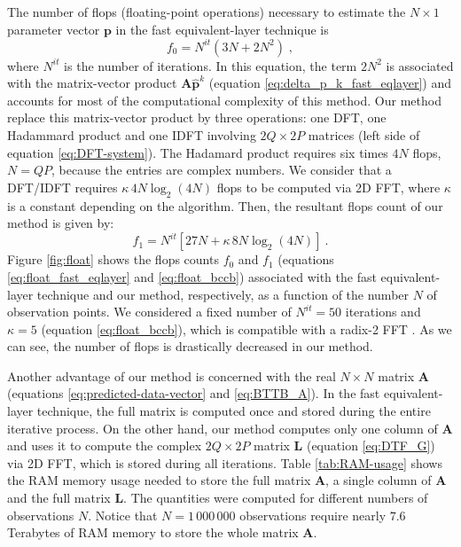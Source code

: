 The number of flops (floating-point operations) necessary to estimate the 
$N \times 1$ parameter vector $\mathbf{p}$ in the fast equivalent-layer technique 
\citep{siqueira-etal2017} is
\begin{equation}
f_{0} = N^{it} (3N + 2N^{2}) \; ,
\label{eq:float_fast_eqlayer}
\end{equation}
where $N^{it}$ is the number of iterations. In this equation, the term $2N^2$ is associated 
with the matrix-vector product $\mathbf{A} \hat{\mathbf{p}}^{k}$ (equation 
\ref{eq:delta_p_k_fast_eqlayer}) and accounts for most of the computational complexity 
of this method.
Our method replace this matrix-vector product by three operations: 
one DFT, one Hadammard product and one IDFT involving $2Q \times 2P$ matrices 
(left side of equation \ref{eq:DFT-system}). 
The Hadamard product requires six times $4N$ flops, $N = QP$, because the entries are 
complex numbers.
We consider that a DFT/IDFT requires $\kappa \, 4N \log_{2}(4N)$ flops to be computed via 2D FFT, 
where $\kappa$ is a constant depending on the algorithm. 
Then, the resultant flops count of our method is given by:
\begin{equation}
f_{1} = N^{it} \left[ 27N + \kappa \, 8N \log_{2}(4N) \right] \: .
\label{eq:float_bccb}
\end{equation}
Figure \ref{fig:float} shows the flops counts $f_{0}$ and $f_{1}$ (equations \ref{eq:float_fast_eqlayer}
and \ref{eq:float_bccb}) associated with the fast equivalent-layer technique \citep{siqueira-etal2017} and 
our method, respectively, as a function of the number $N$ of observation points. 
We considered a fixed number of $N^{it} = 50$ iterations and $\kappa = 5$ (equation \ref{eq:float_bccb}),
which is compatible with a radix-2 FFT \citep[][ p. 16]{vanloan1992}.
As we can see, the number of flops is drastically decreased in our method.

Another advantage of our method is concerned with the real $N \times N$ matrix $\mathbf{A}$ 
(equations \ref{eq:predicted-data-vector} and \ref{eq:BTTB_A}).
In the fast equivalent-layer technique, the full matrix 
is computed once and stored during the entire iterative process.
On the other hand, our method computes only one column of $\mathbf{A}$ 
and uses it to compute the complex $2Q \times 2P$ matrix $\mathbf{L}$ 
(equation \ref{eq:DTF_G}) via 2D FFT, which is stored during all iterations.
Table \ref{tab:RAM-usage} shows the RAM memory usage needed to store the 
full matrix $\mathbf{A}$, a single column of $\mathbf{A}$ and the full matrix 
$\mathbf{L}$. The quantities were computed for different numbers of observations $N$. 
Notice that $N = 1\,000\,000$ observations require nearly $7.6$ Terabytes of RAM memory 
to store the whole matrix $\mathbf{A}$.

